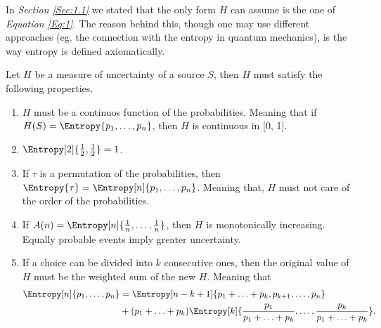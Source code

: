 \documentclass{subfiles}
\begin{document}
    In \emph{Section \ref{Sec:1.1}} we stated that the only form \(H\) can 
    assume is the one of \emph{Equation \eqref{Eq:1}}. 
    The reason behind this, though one may use different approaches 
        (eg. the connection with the entropy in quantum mechanics), 
        is the way entropy is defined axiomatically. 

    \begin{axiom*}
        Let \(H\) be a measure of uncertainty of a source \(S\), 
            then \(H\) must satisfy the following properties.
        \begin{enumerate}
            \item \(H\) must be a continuos function of the probabilities.
                Meaning that if \(H(S) = \Entropy{p_{1}, \ldots, p_{n}}\), 
                then \(H\) is continuous in [0, 1].

            \item \(\Entropy[2]{\tfrac{1}{2}, \tfrac{1}{2}} = 1\).

            \item If \(\tau\) is a permutation of the probabilities, 
                then \(\Entropy{\tau} = \Entropy[n]{p_{1}, \ldots, p_{n}}\). 
                Meaning that, \(H\) must not care of the order of the probabilities.

            \item If \(A(n) = \Entropy[n]{\tfrac{1}{n}, \ldots, \tfrac{1}{n}}\),
                then \(H\) is monotonically increasing.
                Equally probable events imply greater uncertainty.

            \item If a choice can be divided into \(k\) consecutive ones,
                then the original value of \(H\) must be the weighted sum of the new \(H\).
                Meaning that
                \[\begin{aligned}
                    \Entropy[n]{p_{1}, \ldots, p_{n}} & = 
                        \Entropy[n - k + 1]{
                            p_{1} + \ldots + p_{k}, p_{k + 1}, \ldots, p_{n}
                        } \\ 
                        & + (p_{1} + \ldots + p_{k})
                            \Entropy[k]{
                                \frac{p_{1}}{p_{1} + \ldots + p_{k}},
                                \ldots,
                                \frac{p_{k}}{p_{1} + \ldots + p_{k}}
                            }.
                \end{aligned}\]
       \end{enumerate}
    \end{axiom*} 
\end{document}
